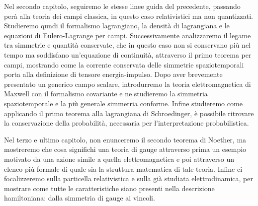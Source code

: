     Nel secondo capitolo, seguiremo le stesse linee guida del precedente, passando perà alla teoria dei campi classica, in questo caso relativistici ma non quantizzati. Studieremo qundi il formalismo lagrangiano, la densità di lagrangiana e le equazioni di Eulero-Lagrange per campi. Successivamente analizzaremo il legame tra simmetrie e quantità conservate, che in questo caso non si conservano più nel tempo ma soddisfano un'equazione di continuità, attraverso il primo teorema per campi, mostrando come la corrente conservata delle simmetrie spaziotemporali porta alla definizione di tensore energia-impulso. Dopo aver brevemente presentato un generico campo scalare, introdurremo la teoria elettromagnetica di Maxwell con il formalismo covariante e ne studieremo la simmetria spaziotemporale e la più generale simmetria conforme. Infine studieremo come applicando il primo teorema alla lagrangiana di Schroedinger, è possibile ritrovare la conservazione della probabilità, necessaria per l'interpretazione probabilistica.

    Nel terzo e ultimo capitolo, non enunceremo il secondo teorema di Noether, ma mostreremo che cosa significhi una teoria di gauge attraverso prima un esempio motivato da una azione simile a quella elettromagnetica e poi attraverso un elenco più formale di quale sia la struttura matematica di tale teoria. Infine ci focalizzeremo sulla particella relativistica e sulla già studiata elettrodinamica, per mostrare come tutte le caratteristiche siano presenti nella descrizione hamiltoniana: dalla simmetria di gauge ai vincoli. 


    





